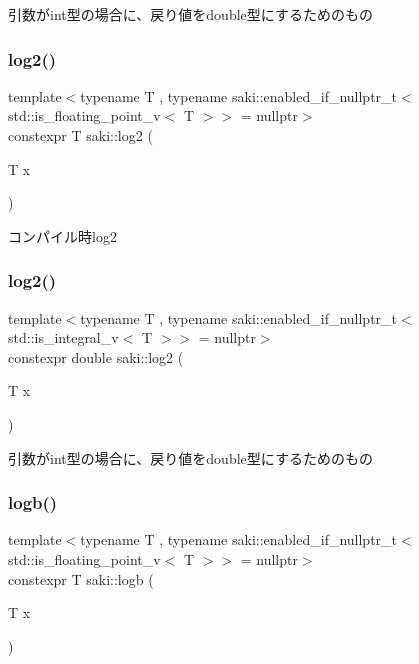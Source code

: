 引数がint型の場合に、戻り値をdouble型にするためのもの 

\mbox{\label{namespacesaki_ac184cde6c3531e01531219e081e25452}} 
\subsubsection{\texorpdfstring{log2()}{log2()}\hspace{0.1cm}{\footnotesize\ttfamily [1/2]}}
{\footnotesize\ttfamily template$<$typename T , typename saki\+::enabled\+\_\+if\+\_\+nullptr\+\_\+t$<$ std\+::is\+\_\+floating\+\_\+point\+\_\+v$<$ T $>$$>$  = nullptr$>$ \\
constexpr T saki\+::log2 (\begin{DoxyParamCaption}\item[{T}]{x }\end{DoxyParamCaption})}



コンパイル時log2 

\mbox{\label{namespacesaki_a8cb2f664389aab32abc797d9a60db4dc}} 
\subsubsection{\texorpdfstring{log2()}{log2()}\hspace{0.1cm}{\footnotesize\ttfamily [2/2]}}
{\footnotesize\ttfamily template$<$typename T , typename saki\+::enabled\+\_\+if\+\_\+nullptr\+\_\+t$<$ std\+::is\+\_\+integral\+\_\+v$<$ T $>$$>$  = nullptr$>$ \\
constexpr double saki\+::log2 (\begin{DoxyParamCaption}\item[{T}]{x }\end{DoxyParamCaption})}



引数がint型の場合に、戻り値をdouble型にするためのもの 

\mbox{\label{namespacesaki_ab7e81af48b13fbf88f135d296471bac1}} 
\subsubsection{\texorpdfstring{logb()}{logb()}\hspace{0.1cm}{\footnotesize\ttfamily [1/2]}}
{\footnotesize\ttfamily template$<$typename T , typename saki\+::enabled\+\_\+if\+\_\+nullptr\+\_\+t$<$ std\+::is\+\_\+floating\+\_\+point\+\_\+v$<$ T $>$$>$  = nullptr$>$ \\
constexpr T saki\+::logb (\begin{DoxyParamCaption}\item[{T}]{x }\end{DoxyParamCaption})}



